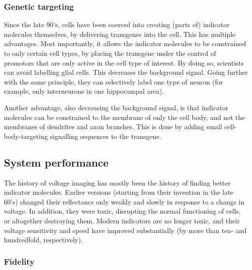 \subsubsection{Genetic targeting}

Since the late 90's, cells have been coerced into creating (parts of) indicator molecules themselves, by delivering transgenes into the cell.\cite{Siegel1997GeneticallyEncodedOptical}
This has multiple advantages. Most importantly, it allows the indicator molecules to be constrained to only certain cell types, by placing the transgene under the control of promotors that are only active in the cell type of interest. By doing so, scientists can avoid labelling glial cells. This decreases the background signal. Going further with the same principle, they can selectively label one type of neuron (for example, only interneurons in one hippocampal area).\cite{Hochbaum2014AllopticalElectrophysiologyMammaliana}

Another advantage, also decreasing the background signal, is that indicator molecules can be constrained to the membrane of only the cell body, and not the membranes of dendrites and axon branches. This is done by adding small cell-body-targeting signalling sequences to the transgene.



\subsection{System performance}

The history of voltage imaging has mostly been the history of finding better indicator molecules. Earlier versions (starting from their invention in the late 60's) changed their reflectance only weakly and slowly in response to a change in voltage. In addition, they were toxic, disrupting the normal functioning of cells, or altogether destroying them.\cite{Salzberg1973OpticalRecordingImpulses,Zochowski2000ImagingMembranePotential}
Modern indicators are no longer toxic, and their voltage sensitivity and speed have improved substantially (by more than ten- and hundredfold, respectively).\cite{Miller2016SmallMoleculeFluorescent,Tomina2018DualsidedVoltagesensitiveDye}


\subsubsection{Fidelity}

